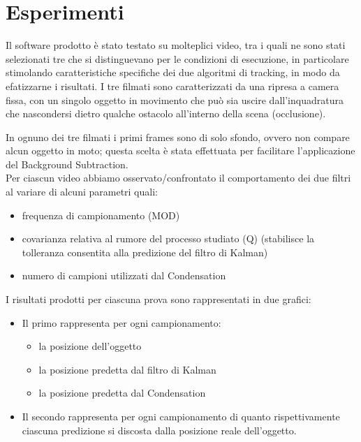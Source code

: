 
\section{Esperimenti}\label{sec:esperimenti}

Il software prodotto è stato testato su molteplici video, tra i quali ne sono stati selezionati tre che si distinguevano per le condizioni di esecuzione, in particolare stimolando caratteristiche specifiche dei due algoritmi di tracking, in modo da efatizzarne i risultati. I tre filmati sono caratterizzati da una ripresa a camera fissa, con un singolo oggetto in movimento che può sia uscire dall'inquadratura che nascondersi dietro qualche ostacolo all'interno della scena (occlusione). 

In ognuno dei tre filmati i primi frames sono di solo sfondo, ovvero non compare alcun oggetto in moto; questa scelta è stata effettuata per facilitare l'applicazione del Background Subtraction.\\

Per ciascun video abbiamo osservato/confrontato il comportamento dei due filtri al variare di alcuni parametri quali:
\begin{itemize}
\item frequenza di campionamento (MOD)
\item covarianza relativa al rumore del processo studiato (Q) (stabilisce la tolleranza consentita alla predizione del filtro di Kalman)
\item numero di campioni utilizzati dal Condensation\\
\end{itemize}

I risultati prodotti per ciascuna prova sono rappresentati in due grafici:
\begin{itemize}
\item Il primo rappresenta per ogni campionamento:
\begin{itemize}
\item la posizione dell'oggetto
\item la posizione predetta dal filtro di Kalman
\item la posizione predetta dal Condensation
\end{itemize}
\item Il secondo rappresenta per ogni campionamento di quanto rispettivamente ciascuna predizione si discosta dalla posizione reale dell'oggetto.
\end{itemize}

